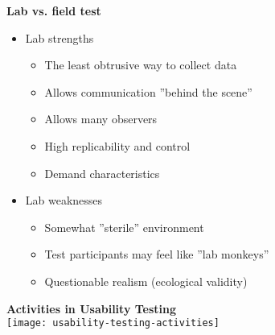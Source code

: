 \textbf{Lab vs. field test}
\begin{itemize}
	\item Lab strengths
	\begin{itemize}
		\item The least obtrusive way to collect data
		\item Allows communication ''behind the scene''
		\item Allows many observers
		\item High replicability and control
		\item Demand characteristics
	\end{itemize}
	\item Lab weaknesses
	\begin{itemize}
		\item Somewhat ''sterile'' environment
		\item Test participants may feel like ''lab monkeys''
		\item Questionable realism (ecological validity)
	\end{itemize}
\end{itemize}
\pagebreak
\textbf{Activities in Usability Testing}\\
\texttt{[image: usability-testing-activities]}
